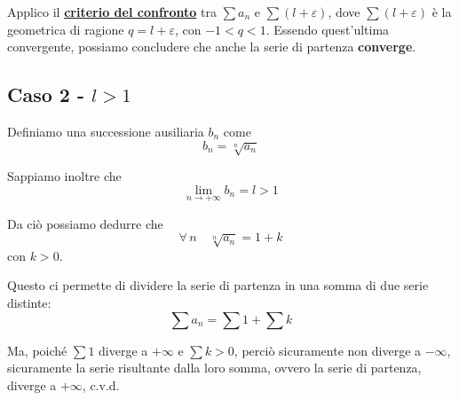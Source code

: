 \documentclass[../../dimostrazioni]{subfiles}
\begin{document}
                Applico il \textbf{\hyperref[serieconfronto]{criterio del confronto}} tra \(\sum a_n\) e \(\sum(l + \varepsilon)\),
                dove \(\sum(l + \varepsilon)\) è la geometrica di ragione \(q = l + \varepsilon\), con \(-1 < q < 1\).
                Essendo quest'ultima convergente, possiamo concludere che anche la serie di partenza \textbf{converge}.

            \subsection*{Caso 2 - \(l > 1\)}

                Definiamo una successione ausiliaria \(b_n\) come
                \[ b_n = \sqrt[n]{a_n} \]

                Sappiamo inoltre che
                \[ \lim_{n \to +\infty}b_n = l > 1 \]

                Da ciò possiamo dedurre che
                \[\forall \, n \quad \sqrt[n]{a_n} = 1 + k\]
                con \(k > 0\).

                Questo ci permette di dividere la serie di partenza in una somma di due serie distinte:
                \[\sum a_n = \sum 1 + \sum k\]

                Ma, poiché \(\sum 1\) diverge a \(+ \infty\) e \(\sum k > 0\), perciò sicuramente non diverge a \(- \infty\),
                sicuramente la serie risultante dalla loro somma, ovvero la serie di partenza, diverge a \(+ \infty\), c.v.d.
\end{document}
